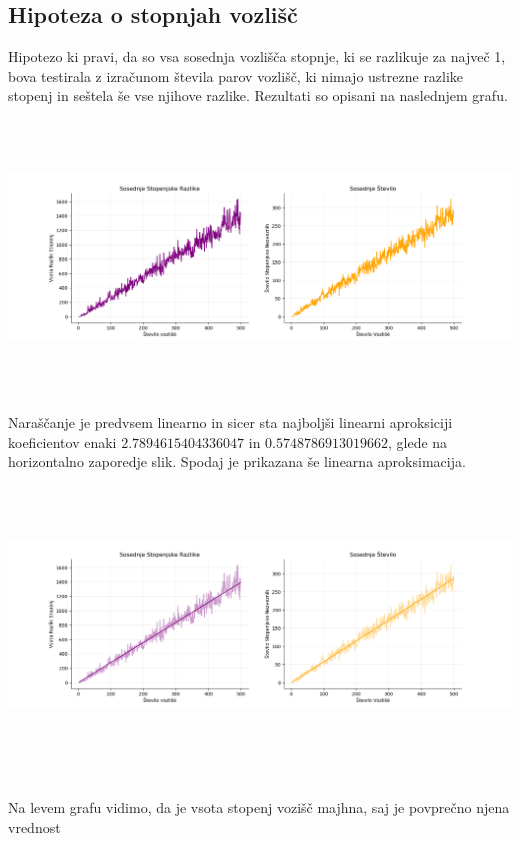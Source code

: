 \documentclass[ letterpaper, titlepage, fleqn]{article}
\begin{document}
\subsection{Hipoteza o stopnjah vozlišč}
Hipotezo ki pravi, da so vsa sosednja vozlišča stopnje, ki se razlikuje za največ 1, bova testirala
z izračunom števila parov vozlišč, ki nimajo ustrezne razlike stopenj in seštela še vse njihove razlike.
Rezultati so opisani na naslednjem grafu.\\
\includegraphics[width=\textwidth, height=8cm]{graphics/degree_difference.png}\\
Naraščanje je predvsem linearno in sicer sta najboljši linearni aproksiciji koeficientov enaki
$2.7894615404336047$ in $0.5748786913019662$, glede na horizontalno zaporedje slik.
Spodaj je prikazana še linearna aproksimacija. \\
\includegraphics[width=\textwidth, height=8cm]{graphics/degree_difference_linear_aproximation.png}\\
\\
Na levem grafu vidimo, da je vsota stopenj vozišč majhna, saj je povprečno njena vrednost
\end{document}
